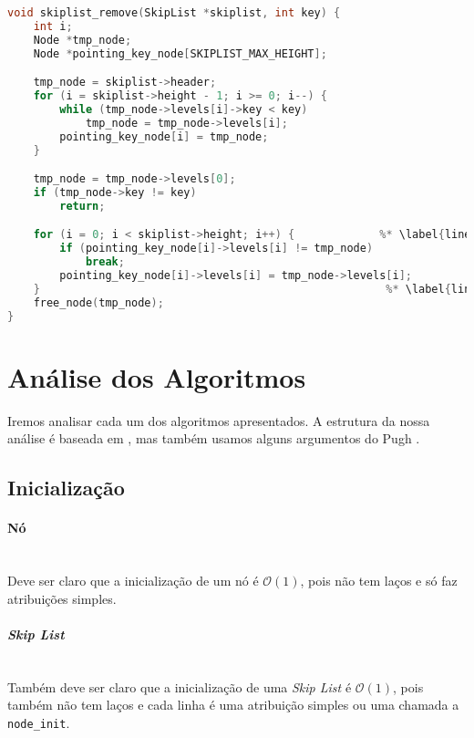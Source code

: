 \documentclass[paper=a4, fontsize=11pt]{scrartcl} %
\numberwithin{equation}{section}
\numberwithin{figure}{section}
\numberwithin{table}{section}
\numberwithin{definition}{section}
\numberwithin{theorem}{section}
\numberwithin{property}{section}
\numberwithin{proposition}{section}
\newcommand{\cO}{\ensuremath{\mathcal{O}}}
\newcommand{\SL}{\textit{Skip List}\xspace}
\begin{document}
\begin{lstlisting}[caption=Remoção., language=C]
void skiplist_remove(SkipList *skiplist, int key) {
    int i;
    Node *tmp_node;
    Node *pointing_key_node[SKIPLIST_MAX_HEIGHT];

    tmp_node = skiplist->header;
    for (i = skiplist->height - 1; i >= 0; i--) {
        while (tmp_node->levels[i]->key < key)
            tmp_node = tmp_node->levels[i];
        pointing_key_node[i] = tmp_node;
    }

    tmp_node = tmp_node->levels[0];
    if (tmp_node->key != key) 
        return;

    for (i = 0; i < skiplist->height; i++) {             %* \label{line:rem_p1} *)
        if (pointing_key_node[i]->levels[i] != tmp_node)
            break;
        pointing_key_node[i]->levels[i] = tmp_node->levels[i];
    }                                                     %* \label{line:rem_p2} *)
    free_node(tmp_node);
}

\end{lstlisting}


\section{Análise dos Algoritmos}

Iremos analisar cada um dos algoritmos apresentados. A estrutura da nossa análise é baseada em 
\cite{mendes2008estruturas}, mas também usamos alguns argumentos do Pugh \cite{pugh1990skip}.

\subsection{Inicialização}

\paragraph{Nó}
\ \\ 
Deve ser claro que a inicialização de um nó é $\cO(1)$, pois não tem laços e só faz atribuições simples.

\paragraph{\SL}
\ \\
Também deve ser claro que a inicialização de uma \SL é $\cO(1)$, pois também não tem laços e cada linha é
uma atribuição simples ou uma chamada a \verb|node_init|.
\end{document}
